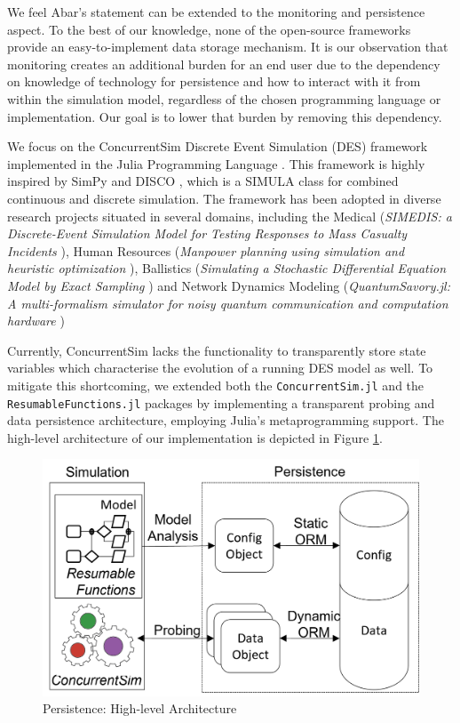 \documentclass{juliacon}
\begin{document}
We feel Abar's statement can be extended to the monitoring and persistence aspect. To the best of our knowledge, none of the open-source frameworks provide an easy-to-implement data storage mechanism. It is our observation that monitoring creates an additional burden for an end user due to the dependency on knowledge of technology for persistence and how to interact with it from within the simulation model, regardless of the chosen programming language or implementation. Our goal is to lower that burden by removing this dependency. \vskip 6pt

We focus on the ConcurrentSim  \cite{lauwens2017simjulia,lauwens2017simjuliaSite} Discrete Event Simulation (DES) framework implemented in the Julia Programming Language \cite{bezanson2017julia}. This framework is highly inspired by SimPy \cite{SimPy} and DISCO \cite{helsgaun1980disco}, which is a SIMULA \cite{DahlNygaard1966simula} class for combined continuous and discrete simulation. The framework has been adopted in diverse research projects situated in several domains, including the Medical (\textit{SIMEDIS: a Discrete-Event Simulation Model for Testing Responses to Mass Casualty Incidents} \cite{de2018simedis}), Human Resources (\textit{Manpower planning using simulation and heuristic optimization} \cite{abdessameud2019manpower}), Ballistics (\textit{Simulating a Stochastic Differential Equation Model by Exact Sampling} \cite{hermosilla2017ballistics}) and Network Dynamics Modeling (\textit{QuantumSavory.jl: A multi-formalism simulator for noisy quantum communication and computation hardware} \cite{QuantumSavory})\vskip 6pt

Currently, ConcurrentSim  lacks the functionality to transparently store state variables which characterise the evolution of a running DES model as well. To mitigate this shortcoming, we extended both the \texttt{ConcurrentSim.jl}  \cite{lauwens2017simjulia,lauwens2017simjuliaSite} and the \texttt{ResumableFunctions.jl} \cite{lauwens2017resumablefunctions} packages by implementing a transparent probing and data persistence architecture, employing Julia's metaprogramming support. The high-level architecture of our implementation is depicted in Figure \ref{fig:highlevelarch}.
\begin{figure}[th]
	\centering
	\includegraphics[width=0.9\linewidth]{images/HighLevelArch}
	\caption{Persistence: High-level Architecture}
	\label{fig:highlevelarch}
\end{figure}
\end{document}

